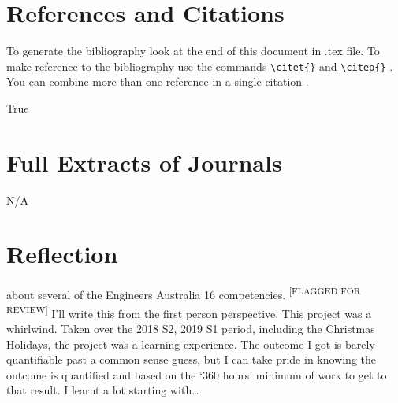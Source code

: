 \documentclass{UoNMCHA}
\newcommand{\flagforreview}{\textsuperscript{\color{red} [FLAGGED FOR REVIEW]}}
\numberwithin{equation}{section}
\begin{document}
%
%
%
%
\section{References and Citations}\label{sec:RefCite}
To generate the bibliography look at the end of this document in .tex file. To make reference to the bibliography use the commands \verb|\citet{}| and \verb|\citep{}| \citep{strunk2007elements}. You can combine more than one reference in a single citation \citep{troyka1999simon, jay1995write}.

True \cite{TFwebsite2}
\citet{TFwebsite2}
 


\newpage
\appendix
\section{Full Extracts of Journals}
N/A
\section{Reflection}
about several of the Engineers Australia 16 competencies.  \flagforreview
I'll write this from the first person perspective.
This project was a whirlwind. Taken over the 2018 S2, 2019 S1 period, including the Christmas Holidays, the project was a learning experience. The outcome I got is barely quantifiable past a common sense guess, but I can take pride in knowing the outcome is quantified and based on the `360 hours' minimum of work to get to that result. I learnt a lot starting with\dots
\end{document}
